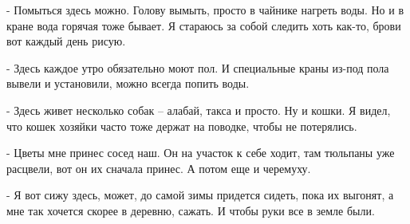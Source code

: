 - Помыться здесь можно. Голову вымыть, просто в чайнике нагреть воды. Но и в
кране вода горячая тоже бывает. Я стараюсь за собой следить хоть как-то, брови
вот каждый день рисую.

- Здесь каждое утро обязательно моют пол. И специальные краны из-под пола
вывели и установили, можно всегда попить воды.

- Здесь живет несколько собак – алабай, такса и просто. Ну и кошки. Я видел,
что кошек хозяйки часто тоже держат на поводке, чтобы не потерялись.

- Цветы мне принес сосед наш. Он на участок к себе ходит, там тюльпаны уже
расцвели, вот он их сначала принес. А потом еще и черемуху.

- Я вот сижу здесь, может, до самой зимы придется сидеть, пока их выгонят, а
мне так хочется скорее в деревню, сажать. И чтобы руки все в земле были.
